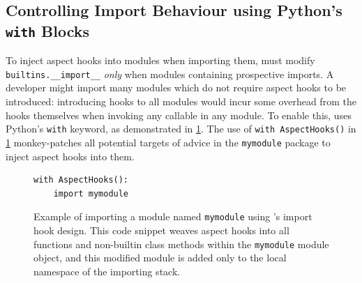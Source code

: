\subsection{Controlling Import Behaviour using Python's \lstinline{with} Blocks}
\label{pdsf3implementingimporthooks}

To inject aspect hooks into modules when importing them, \pdsfthree{} must modify
\lstinline{builtins.__import__} \emph{only} when modules containing prospective
imports. A developer might import many modules which do not require aspect hooks
to be introduced: introducing hooks to all modules would incur some overhead
from the hooks themselves when invoking any callable in any module. To enable
this, \pdsfthree{} uses Python's \lstinline{with} keyword, as demonstrated in
\cref{fig:simple_aspect_hook_weaving_example}. The use of
\lstinline{with AspectHooks()} in \cref{fig:simple_aspect_hook_weaving_example} monkey-patches
all potential targets of advice in the \lstinline{mymodule} package to inject
aspect hooks into them.

\begin{figure}
    \centering
    \begin{lstlisting}[style=footnotesize_python]
with AspectHooks():
    import mymodule
    \end{lstlisting}
    \caption{Example of importing a module named \lstinline{mymodule} using
    \pdsfthree{}'s import hook design. This code snippet weaves aspect hooks into all
    functions and non-builtin class methods within the \lstinline{mymodule}
    module object, and this modified module is added only to the local namespace
    of the importing stack.}
    \label{fig:simple_aspect_hook_weaving_example}
\end{figure}

